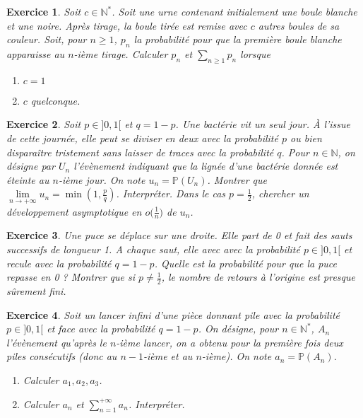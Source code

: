 \documentclass[12pt]{article}
\newtheorem{exercise}{Exercice}[section]
\theoremstyle{remark}
\theoremstyle{remark}
\newcommand{\N}{\mathbb{N}}
\renewcommand{\P}{\mathbb{P}}
\begin{document}
\begin{exercise}
	Soit $c\in\N^{*}$. Soit une urne contenant initialement une boule blanche et
	une noire. Après tirage, la boule tirée est remise avec $c$ autres boules de
	sa couleur. Soit, pour $n\geqslant1$, $p_{n}$ la probabilité pour que la
	première boule blanche apparaisse au $n$-ième tirage. Calculer $p_{n}$ et
	$\sum_{n\geqslant1}p_{n}$ lorsque 
	\begin{enumerate}
		\item $c=1$
		\item $c$ quelconque.
	\end{enumerate}
\end{exercise}

\begin{exercise}
	Soit $p\in]0,1[$ et $q=1-p$. Une bactérie vit un seul jour. \`A l'issue de
	cette journée, elle peut se diviser en deux avec la probabilité $p$ ou bien
	disparaître tristement sans laisser de traces avec la probabilité $q$. Pour
	$n\in\N$, on désigne par $U_{n}$ l'évènement indiquant que la lignée d'une
	bactérie donnée est éteinte au $n$-ième jour. On note $u_{n}=\P(U_{n})$.
	Montrer que $\lim\limits_{n\to+\infty}u_{n}=\min(1,\frac{p}{q})$.
	Interpréter. Dans le cas $p=\frac{1}{2}$, chercher un développement
	asymptotique en $o\bigl(\frac{1}{n}\bigr)$ de $u_{n}$.
\end{exercise}

\begin{exercise}
	Une puce se déplace sur une droite. Elle part de 0 et fait des sauts
	successifs de longueur 1. A chaque saut, elle avec avec la probabilité
	$p\in]0,1[$ et recule avec la probabilité $q=1-p$. Quelle est la probabilité
	pour que la puce repasse en 0 ? Montrer que si $p\neq\frac{1}{2}$, le nombre
	de retours à l'origine est presque sûrement fini.
\end{exercise}

\begin{exercise}
	Soit un lancer infini d'une pièce donnant pile avec la probabilité
	$p\in]0,1[$ et face avec la probabilité $q=1-p$. On désigne, pour
	$n\in\N^{*}$, $A_{n}$ l'évènement qu'après le $n$-ième lancer, on a obtenu
	pour la première fois deux piles consécutifs (donc au $n-1$-ième et au
	$n$-ième). On note $a_{n}=\P(A_{n})$. 
	\begin{enumerate}
		\item Calculer $a_{1},a_{2},a_{3}$.
		\item Calculer $a_{n}$ et $\sum_{n=1}^{+\infty}a_{n}$. Interpréter.
	\end{enumerate}
\end{exercise}
\end{document}
